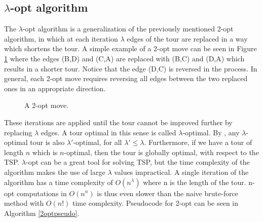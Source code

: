 \documentclass[english, 12pt, a4paper, sci, utf8, a-1b, online]{aaltothesis}
\begin{document}
\subsection{$\lambda$-opt algorithm}
The $\lambda$-opt algorithm is a generalization of the previously mentioned 2-opt algorithm, in which at each iteration $\lambda$ edges of the tour are replaced in a way which shortens the tour. A simple example of a 2-opt move can be seen in Figure \ref{2optpic} where the edges (B,D) and (C,A) are replaced with (B,C) and (D,A) which results in a shorter tour. Notice that the edge (D,C) is reversed in the process. In general, each 2-opt move requires reversing all edges between the two replaced ones in an appropriate direction.
\begin{figure}[H]
\centering
{}
\caption{A 2-opt move.} \label{2optpic}
\end{figure}

These iterations are applied until the tour cannot be improved further by replacing $\lambda$ edges. A tour optimal in this sense is called $\lambda$-optimal. By \cite{HELSGAUN2000106}, any $\lambda$-optimal tour is also $\lambda'$-optimal, for all $\lambda' \leq \lambda$. Furthermore, if we have a tour of length $n$ which is $n$-optimal, then the tour is globally optimal, with respect to the TSP. $\lambda$-opt can be a great tool for solving TSP, but the time complexity of the algorithm makes the use of large $\lambda$ values impractical. A single iteration of the algorithm has a time complexity of $O(n^\lambda)$ where n is the length of the tour. n-opt computations in $O(n^n)$ is thus even slower than the naive brute-force method with $O(n!)$ time complexity. Pseudocode for 2-opt can be seen in Algorithm \ref{2optpseudo}. 
\end{document}
